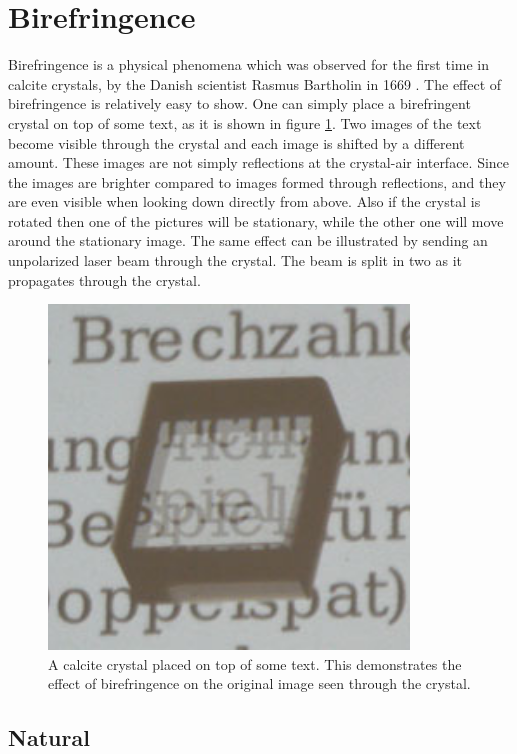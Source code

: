 \section{Birefringence}
Birefringence is a physical phenomena which was observed for the first time in calcite crystals, by the Danish scientist Rasmus Bartholin in 1669 \cite{RasmusBartholin1669ExperimentaDetegitur}. The effect of birefringence is relatively easy to show. One can simply place a birefringent crystal on top of some text, as it is shown in figure \ref{fig:3birefringence}. Two images of the text become visible through the crystal and each image is shifted by a different amount. These images are not simply reflections at the crystal-air interface. Since the images are brighter compared to images formed through reflections, and they are even visible when looking down directly from above. Also if the crystal is rotated then one of the pictures will be stationary, while the other one will move around the stationary image. The same effect can be illustrated by sending an unpolarized laser beam through the crystal. The beam is split in two as it propagates through the crystal. \cite{Roth2019Optik}

\begin{figure}
    \centering
    \includegraphics[scale=0.35]{images/3_chapter03/birefringence.png}
    \caption{A calcite crystal placed on top of some text. This demonstrates the effect of birefringence on the original image seen through the crystal. \cite{Roth2019Optik}}
    \label{fig:3birefringence}
\end{figure}

\subsection{Natural}

